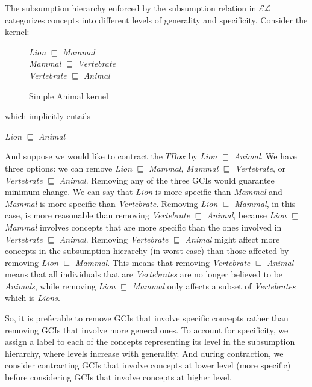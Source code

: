 The subsumption hierarchy enforced by the subsumption relation in $\mathcal{EL}$ categorizes concepts into different levels of generality and specificity. Consider the kernel:%
\begin{figure}[h]
\begin{center}
\textit{Lion} $\sqsubseteq$ \textit{Mammal}\\
\textit{Mammal} $\sqsubseteq$ \textit{Vertebrate}\\
\textit{Vertebrate} $\sqsubseteq$ \textit{Animal}
\end{center}
\caption{Simple Animal kernel}
\label{fig:AnimalKernel}
\end{figure}


\begin{flushleft}
which implicitly entails
\end{flushleft}
\begin{center}
\textit{Lion} $\sqsubseteq$ \textit{Animal}
\end{center}
And suppose we would like to contract the $TBox$ by \textit{Lion} $\sqsubseteq$ \textit{Animal}. We have three options: we can remove \textit{Lion} $\sqsubseteq$ \textit{Mammal}, \textit{Mammal} $\sqsubseteq$ \textit{Vertebrate}, or \textit{Vertebrate} $\sqsubseteq$ \textit{Animal}. Removing any of the three GCIs would guarantee minimum change. We can say that \textit{Lion} is more specific than \textit{Mammal} and \textit{Mammal} is more specific than \textit{Vertebrate}. Removing \textit{Lion} $\sqsubseteq$ \textit{Mammal}, in this case, is more reasonable than removing \textit{Vertebrate} $\sqsubseteq$ \textit{Animal}, because \textit{Lion } $\sqsubseteq$ \textit{Mammal} involves concepts that are more specific than the ones involved in \textit{Vertebrate} $\sqsubseteq$ \textit{Animal}. Removing \textit{Vertebrate} $\sqsubseteq$ \textit{Animal} might affect more concepts in the subsumption hierarchy (in worst case) than those affected by removing \textit{Lion} $\sqsubseteq$ \textit{Mammal}. This means that removing \textit{Vertebrate} $\sqsubseteq$ \textit{Animal} means that all individuals that are \textit{Vertebrates} are no longer believed to be \textit{Animals}, while removing \textit{Lion} $\sqsubseteq$ \textit{Mammal} only affects a subset of \textit{Vertebrates} which is \textit{Lions}.

So, it is preferable to remove GCIs that involve specific concepts rather than removing GCIs that involve more general ones. To account for specificity, we assign a label to each of the concepts representing its level in the subsumption hierarchy, where levels increase with generality. And during contraction, we consider contracting GCIs that involve concepts at lower level (more specific) before considering GCIs that involve concepts at higher level.

